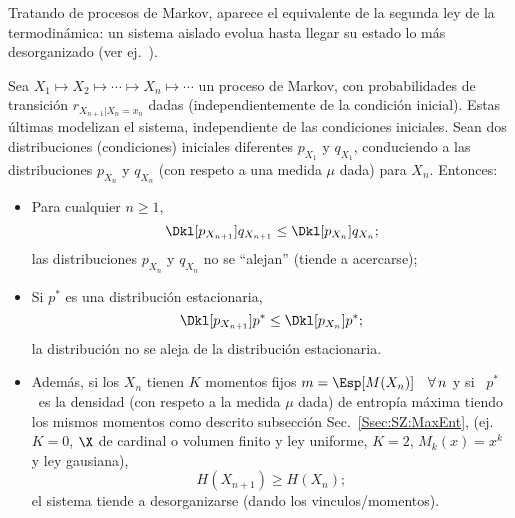 
\label{Ssec:SZ:SecLeyTermo}

Tratando de procesos  de Markov, aparece el equivalente de la  segunda ley de la
termodin\'amica:  un sistema  aislado evolua  hasta  llegar su  estado lo  m\'as
desorganizado (ver ej.~\cite[y ref.]{CovTho06, Mer10, Mer18}).

\begin{lema}
\label{Lem:SZ:2ndLeyTermodinamica}
%
  Sea $X_1 \mapsto X_2 \mapsto \cdots  \mapsto X_n \mapsto \cdots$ un proceso de
  Markov,  con   probabilidades  de  transici\'on   $r_{X_{n+1}|X_n=x_n}$  dadas
  (independientemente de la condici\'on  inicial).  Estas \'ultimas modelizan el
  sistema, independiente de las  condiciones iniciales.  Sean dos distribuciones
  (condiciones) iniciales  diferentes $p_{X_1}$  y $q_{X_1}$, conduciendo  a las
  distribuciones $p_{X_n}$  y $q_{X_n}$  (con respeto a  una medida  $\mu$ dada)
  para $X_n$. Entonces:
%
\begin{itemize}
\item  Para cualquier  $n \ge  1$,
  \[
  \Dkl[p_{X_{n+1}}]{q_{X_{n+1}}} \le \Dkl[p_{X_n}]{q_{X_n}};
  \]
  las  distribuciones   $p_{X_n}$  y  $q_{X_n}$  no  se   ``alejan''  (tiende  a
  acercarse);
%
\item  Si  $p^*$  es  una  distribuci\'on  estacionaria,
  \[
  \Dkl[p_{X_{n+1}}]{p^*} \le \Dkl[p_{X_n}]{p^*};
  \]
  la distribuci\'on no se aleja de la distribuci\'on estacionaria.
%
\item Adem\'as, si  los $X_n$ tienen $K$ momentos fijos  $m = \Esp[M(X_n)] \quad
  \forall \,  n$ y si \  $p^*$ \ es la  densidad (con respeto a  la medida $\mu$
  dada)  de  entrop\'ia  m\'axima  tiendo  los  mismos  momentos  como  descrito
  subsecci\'on  Sec.~\ref{Ssec:SZ:MaxEnt}, (ej.   $K =  0$, $\X$  de  cardinal o
  volumen finito y ley uniforme, $K = 2$, $M_k(x) = x^k$ y ley gausiana),
  \[
  H(X_{n+1}) \ge H(X_n);
  \]
  el  sistema   tiende  a  desorganizarse (dando los vinculos/momentos).
\end{itemize}
\end{lema}
%
